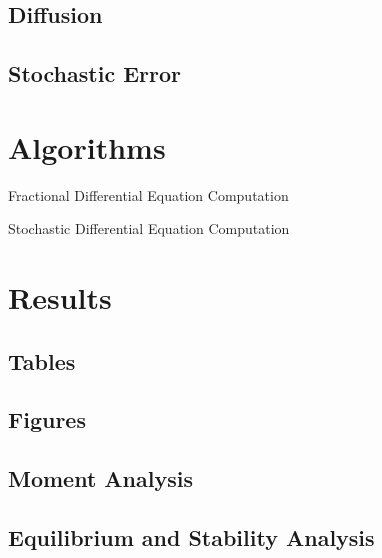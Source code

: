 \subsection{Diffusion}

\subsection{Stochastic Error}


\section{Algorithms}
\begin{algorithm}[H]
\begin{algorithmic}[1]
\end{algorithmic}
\caption{Fractional Differential Equation Computation}
	\label{Algorithm_1}
\end{algorithm}

\begin{algorithm}[H]
\begin{algorithmic}[1]
\end{algorithmic}
\caption{Stochastic Differential Equation Computation}
	\label{Algorithm_2}
\end{algorithm}

\section{Results}

\subsection{Tables}

\subsection{Figures}

\subsection{Moment Analysis}
\subsection{Equilibrium and Stability Analysis}
